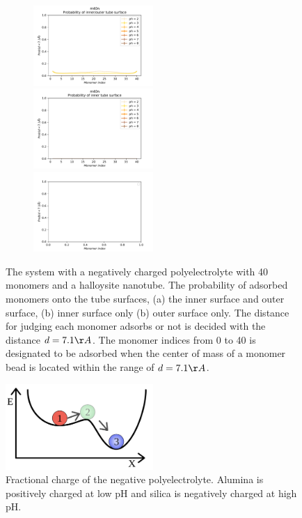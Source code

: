     \begin{figure}[h!]
      \centering
        \begin{subfigure}{\linewidth}
          \centering
            \includegraphics[width=0.5\textwidth]{fig/m40n-prob-io.pdf}  
            \includegraphics[width=0.5\textwidth]{fig/m40n-prob-i.pdf}
            \includegraphics[width=0.5\textwidth]{fig/m40n-prob-o.pdf}
            \end{subfigure}\par\medskip
     \caption{The system with a negatively charged polyelectrolyte with 40 monomers and a halloysite nanotube. The probability of adsorbed monomers onto the tube surfaces, (a) the inner surface and outer surface, (b) inner surface only (b) outer surface only. The distance for judging each monomer adsorbs or not is decided with the distance $d = 7.1\AA$. The monomer indices from 0 to 40 is designated to be adsorbed when the center of mass of a monomer bead is located within the range of $d = 7.1\AA$.  }
    \label{fig:m40n-prob} %
    \end{figure}
    
    \begin{figure}[h!]
      \centering
        \includegraphics[width=0.5\textwidth]{fig/metastable.png}
     \caption{Fractional charge of the negative polyelectrolyte. Alumina is positively charged at low pH and silica is negatively charged at high pH. }
    \label{fig:m40n-frach}
    \end{figure}

